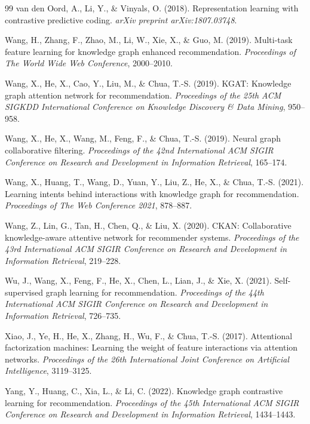 \documentclass[12pt,a4paper]{article}
\begin{document}
\begin{thebibliography}{99}
van den Oord, A., Li, Y., \& Vinyals, O. (2018). Representation learning with contrastive predictive coding. \textit{arXiv preprint arXiv:1807.03748}.

Wang, H., Zhang, F., Zhao, M., Li, W., Xie, X., \& Guo, M. (2019). Multi-task feature learning for knowledge graph enhanced recommendation. \textit{Proceedings of The World Wide Web Conference}, 2000--2010.

Wang, X., He, X., Cao, Y., Liu, M., \& Chua, T.-S. (2019). KGAT: Knowledge graph attention network for recommendation. \textit{Proceedings of the 25th ACM SIGKDD International Conference on Knowledge Discovery \& Data Mining}, 950--958.

Wang, X., He, X., Wang, M., Feng, F., \& Chua, T.-S. (2019). Neural graph collaborative filtering. \textit{Proceedings of the 42nd International ACM SIGIR Conference on Research and Development in Information Retrieval}, 165--174.

Wang, X., Huang, T., Wang, D., Yuan, Y., Liu, Z., He, X., \& Chua, T.-S. (2021). Learning intents behind interactions with knowledge graph for recommendation. \textit{Proceedings of The Web Conference 2021}, 878--887.

Wang, Z., Lin, G., Tan, H., Chen, Q., \& Liu, X. (2020). CKAN: Collaborative knowledge-aware attentive network for recommender systems. \textit{Proceedings of the 43rd International ACM SIGIR Conference on Research and Development in Information Retrieval}, 219--228.

Wu, J., Wang, X., Feng, F., He, X., Chen, L., Lian, J., \& Xie, X. (2021). Self-supervised graph learning for recommendation. \textit{Proceedings of the 44th International ACM SIGIR Conference on Research and Development in Information Retrieval}, 726--735.

Xiao, J., Ye, H., He, X., Zhang, H., Wu, F., \& Chua, T.-S. (2017). Attentional factorization machines: Learning the weight of feature interactions via attention networks. \textit{Proceedings of the 26th International Joint Conference on Artificial Intelligence}, 3119--3125.

Yang, Y., Huang, C., Xia, L., \& Li, C. (2022). Knowledge graph contrastive learning for recommendation. \textit{Proceedings of the 45th International ACM SIGIR Conference on Research and Development in Information Retrieval}, 1434--1443.


\end{thebibliography}
\end{document}
